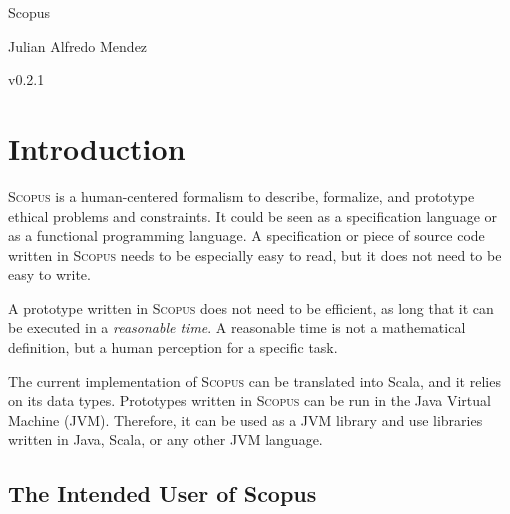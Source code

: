 \documentclass[12pt,a4paper]{book}
\newcommand{\Scopus}{\textsc{Scopus}\xspace}
\begin{document}

    \begin{center}

        \phantom{H}

        \vspace{80mm}

        {\huge{Scopus}}

        \vspace{80mm}
        Julian Alfredo Mendez

        \vspace{10mm}
        v0.2.1

    \end{center}

    \newpage


    \chapter{Introduction}

    \Scopus is a human-centered formalism to describe, formalize, and prototype ethical problems and constraints.
    It could be seen as a specification language or as a functional programming language.
    A specification or piece of source code written in \Scopus needs to be especially easy to read, but it does not need to be easy to write.

    A prototype written in \Scopus does not need to be efficient, as long that it can be executed in a \textit{reasonable time}.
    A reasonable time is not a mathematical definition, but a human perception for a specific task.

    The current implementation of \Scopus can be translated into Scala, and it relies on its data types.
    Prototypes written in \Scopus can be run in the Java Virtual Machine (JVM).
    Therefore, it can be used as a JVM library and use libraries written in Java, Scala, or any other JVM language.


    \section{The Intended User of Scopus}
\end{document}
